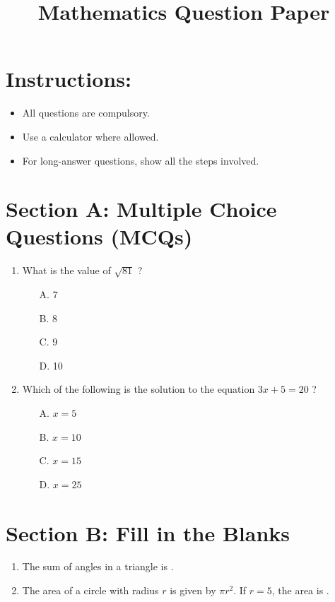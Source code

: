 \documentclass[a4paper,12pt]{article}
\begin{document}
\title{Mathematics Question Paper}
\author{}
\date{}
\maketitle

\section*{Instructions:}
\begin{itemize}
    \item All questions are compulsory.
    \item Use a calculator where allowed.
    \item For long-answer questions, show all the steps involved.
\end{itemize}

\section*{Section A: Multiple Choice Questions (MCQs)}
\begin{enumerate}
    \item What is the value of $\sqrt{81}$ ?
    \begin{itemize}
        \item[A.] 7
        \item[B.] 8
        \item[C.] 9
        \item[D.] 10
    \end{itemize}
    \item Which of the following is the solution to the equation $3x + 5 = 20$ ?
    \begin{itemize}
        \item[A.] $x = 5$
        \item[B.] $x = 10$
        \item[C.] $x = 15$
        \item[D.] $x = 25$
    \end{itemize}
\end{enumerate}

\section*{Section B: Fill in the Blanks}
\begin{enumerate}
    \item The sum of angles in a triangle is \underline{\hspace{2cm}}.
    \item The area of a circle with radius $r$ is given by $\pi r^2$. If $r = 5$, the area is \underline{\hspace{2cm}}.
\end{enumerate}
\end{document}
